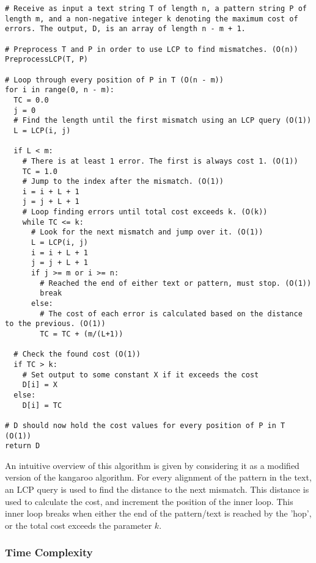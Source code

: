 \documentclass[paper=a4, fontsize=12pt]{article}
\begin{document}
\begin{lstlisting}
# Receive as input a text string T of length n, a pattern string P of length m, and a non-negative integer k denoting the maximum cost of errors. The output, D, is an array of length n - m + 1.

# Preprocess T and P in order to use LCP to find mismatches. (O(n))
PreprocessLCP(T, P)

# Loop through every position of P in T (O(n - m))
for i in range(0, n - m):
  TC = 0.0
  j = 0
  # Find the length until the first mismatch using an LCP query (O(1))
  L = LCP(i, j)

  if L < m:
    # There is at least 1 error. The first is always cost 1. (O(1))
    TC = 1.0
    # Jump to the index after the mismatch. (O(1))
    i = i + L + 1
    j = j + L + 1
    # Loop finding errors until total cost exceeds k. (O(k))
    while TC <= k:
      # Look for the next mismatch and jump over it. (O(1))
      L = LCP(i, j)
      i = i + L + 1
      j = j + L + 1
      if j >= m or i >= n:
        # Reached the end of either text or pattern, must stop. (O(1))
        break
      else:
        # The cost of each error is calculated based on the distance to the previous. (O(1))
        TC = TC + (m/(L+1))

  # Check the found cost (O(1))
  if TC > k:
    # Set output to some constant X if it exceeds the cost
    D[i] = X
  else:
    D[i] = TC

# D should now hold the cost values for every position of P in T (O(1))
return D
\end{lstlisting}

An intuitive overview of this algorithm is given by considering it as a modified
version of the kangaroo algorithm. For every alignment of the pattern in the
text, an LCP query is used to find the distance to the next mismatch. This
distance is used to calculate the cost, and increment the position of the inner
loop. This inner loop breaks when either the end of the pattern/text is reached
by the 'hop', or the total cost exceeds the parameter \(k\).

\subsubsection{Time Complexity}
\end{document}
